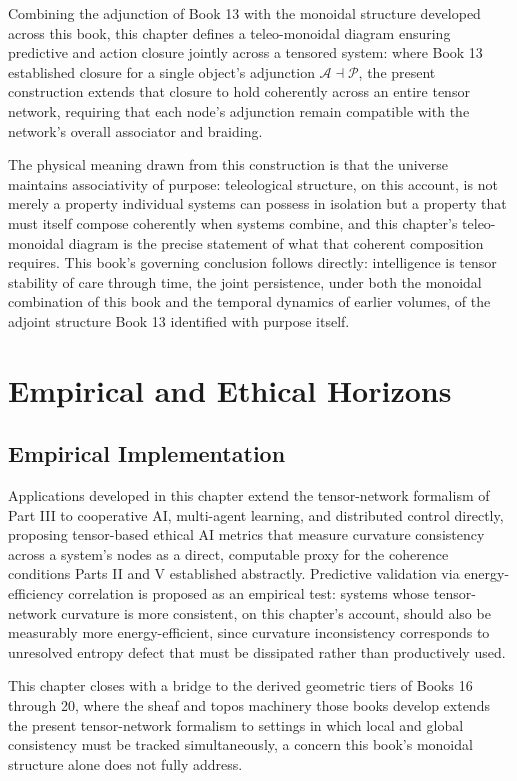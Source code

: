 Combining the adjunction of Book 13 with the monoidal structure developed across this book, this chapter defines a teleo-monoidal diagram ensuring predictive and action closure jointly across a tensored system: where Book 13 established closure for a single object's adjunction $\mathcal{A} \dashv \mathcal{P}$, the present construction extends that closure to hold coherently across an entire tensor network, requiring that each node's adjunction remain compatible with the network's overall associator and braiding.

The physical meaning drawn from this construction is that the universe maintains associativity of purpose: teleological structure, on this account, is not merely a property individual systems can possess in isolation but a property that must itself compose coherently when systems combine, and this chapter's teleo-monoidal diagram is the precise statement of what that coherent composition requires. This book's governing conclusion follows directly: intelligence is tensor stability of care through time, the joint persistence, under both the monoidal combination of this book and the temporal dynamics of earlier volumes, of the adjoint structure Book 13 identified with purpose itself.

\part{Empirical and Ethical Horizons}

\chapter{Empirical Implementation}

Applications developed in this chapter extend the tensor-network formalism of Part III to cooperative AI, multi-agent learning, and distributed control directly, proposing tensor-based ethical AI metrics that measure curvature consistency across a system's nodes as a direct, computable proxy for the coherence conditions Parts II and V established abstractly. Predictive validation via energy-efficiency correlation is proposed as an empirical test: systems whose tensor-network curvature is more consistent, on this chapter's account, should also be measurably more energy-efficient, since curvature inconsistency corresponds to unresolved entropy defect that must be dissipated rather than productively used.

This chapter closes with a bridge to the derived geometric tiers of Books 16 through 20, where the sheaf and topos machinery those books develop extends the present tensor-network formalism to settings in which local and global consistency must be tracked simultaneously, a concern this book's monoidal structure alone does not fully address.

